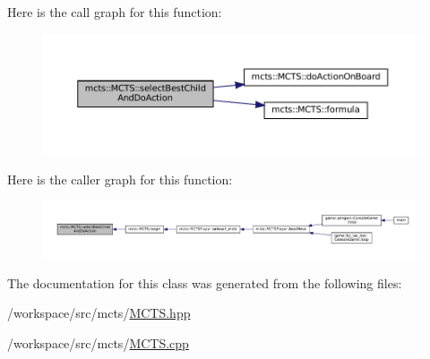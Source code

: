 Here is the call graph for this function\+:
\nopagebreak
\begin{figure}[H]
\begin{center}
\leavevmode
\includegraphics[width=350pt]{classmcts_1_1_m_c_t_s_a5a3c4a056b0611c19839d6757871653b_cgraph}
\end{center}
\end{figure}
Here is the caller graph for this function\+:
\nopagebreak
\begin{figure}[H]
\begin{center}
\leavevmode
\includegraphics[width=350pt]{classmcts_1_1_m_c_t_s_a5a3c4a056b0611c19839d6757871653b_icgraph}
\end{center}
\end{figure}


The documentation for this class was generated from the following files\+:\begin{DoxyCompactItemize}
\item 
/workspace/src/mcts/\hyperlink{_m_c_t_s_8hpp}{M\+C\+T\+S.\+hpp}\item 
/workspace/src/mcts/\hyperlink{_m_c_t_s_8cpp}{M\+C\+T\+S.\+cpp}\end{DoxyCompactItemize}
